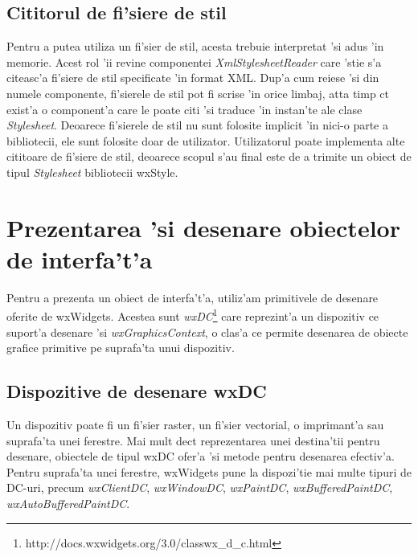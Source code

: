 \subsection{Cititorul de fi'siere de stil}

Pentru a putea utiliza un fi'sier de stil, acesta trebuie interpretat 'si adus 'in memorie. Acest rol 'ii revine componentei \emph{XmlStylesheetReader} care 'stie s'a citeasc'a fi'siere de stil specificate 'in format XML. Dup'a cum reiese 'si din numele componente, fi'sierele de stil pot fi scrise 'in orice limbaj, at{\ia}ta timp c{\ia}t exist'a o component'a care le poate citi 'si traduce 'in instan'te ale clase \emph{Stylesheet}. Deoarece fi'sierele de stil nu sunt folosite implicit 'in nici-o parte a bibliotecii, ele sunt folosite doar de utilizator. Utilizatorul poate implementa alte cititoare de fi'siere de stil, deoarece scopul s'au final este de a trimite un obiect de tipul \emph{Stylesheet} bibliotecii wxStyle.


\section{Prezentarea 'si desenare obiectelor de interfa't'a}

Pentru a prezenta un obiect de interfa't'a, utiliz'am primitivele de desenare oferite de wxWidgets. Acestea sunt \emph{wxDC}\footnote{http://docs.wxwidgets.org/3.0/classwx\_d\_c.html} care reprezint'a un dispozitiv ce suport'a desenare 'si \emph{wxGraphicsContext}, o clas'a ce permite desenarea de obiecte grafice primitive pe suprafa'ta unui dispozitiv. 

\subsection{Dispozitive de desenare wxDC}

Un dispozitiv poate fi un fi'sier raster, un fi'sier vectorial, o imprimant'a sau suprafa'ta unei ferestre. Mai mult dec{\ia}t reprezentarea unei destina'tii pentru desenare, obiectele de tipul wxDC ofer'a 'si metode pentru desenarea efectiv'a. Pentru suprafa'ta unei ferestre, wxWidgets pune la dispozi'tie mai multe tipuri de DC-uri, precum \emph{wxClientDC}, \emph{wxWindowDC}, \emph{wxPaintDC}, \emph{wxBufferedPaintDC}, \emph{wxAutoBufferedPaintDC}.

